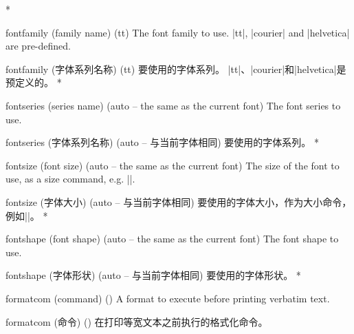 \begin{optionlist}
\begin{paracol}{2}
\switchcolumn[0]*%
\item[fontfamily (family name) (tt)]
The font family to use.
|tt|, |courier| and |helvetica| are pre-defined.
\switchcolumn
\item[fontfamily (字体系列名称) (tt)]
要使用的字体系列。
|tt|、|courier|和|helvetica|是预定义的。
\switchcolumn[0]*%
\item[fontseries (series name) (auto \textrm{-- the same as the current font})]
The font series to use.
\switchcolumn
\item[fontseries (字体系列名称) (auto \textrm{-- 与当前字体相同})]
要使用的字体系列。
\switchcolumn[0]*%
\item[fontsize (font size) (auto \textrm{-- the same as the current font})]
The size of the font to use, as a size command, e.g. |\footnotesize|.
\switchcolumn
\item[fontsize (字体大小) (auto \textrm{-- 与当前字体相同})]
要使用的字体大小，作为大小命令，例如|\footnotesize|。
\switchcolumn[0]*%
\item[fontshape (font shape) (auto \textrm{-- the same as the current font})]
The font shape to use.
\switchcolumn
\item[fontshape (字体形状) (auto \textrm{-- 与当前字体相同})]
要使用的字体形状。
\switchcolumn[0]*%
\item[formatcom (command) (\meta{none})]
A format to execute before printing verbatim text.
\switchcolumn
\item[formatcom (命令) (\meta{无})]
在打印等宽文本之前执行的格式化命令。
\end{paracol}
\end{optionlist}
